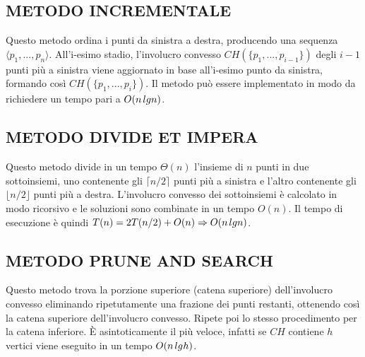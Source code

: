 \documentclass[12pt,a4paper]{report}
\begin{document}
\subsection*{\small{METODO INCREMENTALE}}
Questo metodo ordina i punti da sinistra a destra, producendo una sequenza $\langle p_1, ..., p_n\rangle$. All'i-esimo stadio, l'involucro convesso $CH(\{p_1, ..., p_{i-1}\})$ degli $i - 1$ punti più a sinistra viene aggiornato in base all'i-esimo punto da sinistra, formando così $CH(\{p_1, ..., p_i\})$. Il metodo può essere implementato in modo da richiedere un tempo pari a $O(n\hspace{0.05cm}lgn)$.

\subsection*{\small{METODO DIVIDE ET IMPERA}}
Questo metodo divide in un tempo $\Theta(n)$ l'insieme di $n$ punti in due sottoinsiemi, uno contenente gli  $\lceil n/2 \rceil$ punti più a sinistra e l'altro contenente gli $\lfloor n/2 \rfloor$ punti più a destra. L'involucro convesso dei sottoinsiemi è calcolato in modo ricorsivo e le soluzioni sono combinate in un tempo $O(n)$.
Il tempo di esecuzione è quindi $T(n) = 2T(n/2) + O(n) \Rightarrow O(n\hspace{0.05cm}lgn)$.

\subsection*{\small{METODO PRUNE AND SEARCH}}
Questo metodo trova la porzione superiore (catena superiore) dell'involucro convesso eliminando ripetutamente una frazione dei punti restanti, ottenendo così la catena superiore dell'involucro convesso. Ripete poi lo stesso procedimento per la catena inferiore. È asintoticamente il più veloce, infatti se $CH$ contiene $h$ vertici viene eseguito in un tempo $O(n\hspace{0.05cm}lg\hspace{0.01cm}h)$.
\end{document}

